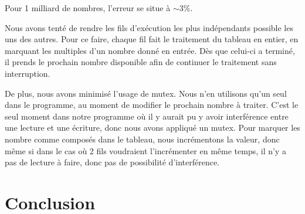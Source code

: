 \documentclass{report}
\begin{document}
	Pour 1 milliard de nombres, l'erreur se situe à $\sim 3\%$.
	
	\bigskip
	Nous avons tenté de rendre les fils d'exécution les plus indépendants 
	possible les uns des autres. Pour ce faire, chaque fil fait le traitement 
	du tableau en entier, en marquant les multiples d'un nombre donné en entrée. 
	Dès que celui-ci a terminé, il prends le prochain nombre disponible afin de 
	continuer le traitement sans interruption.
	
	\smallskip
	De plus, nous avons minimisé l'usage de mutex. Nous n'en utilisons qu'un seul 
	dans le programme, au moment de modifier le prochain nombre à traiter. C'est le 
	seul moment dans notre programme où il y aurait pu y avoir interférence entre 
	une lecture et une écriture, donc nous avons appliqué un mutex. Pour marquer les 
	nombre comme composés dans le tableau, nous incrémentons la valeur, donc même 
	si dans le cas où 2 fils voudraient l'incrémenter en même temps, il n'y a pas 
	de lecture à faire, donc pas de possibilité d'interférence.
	
\chapter{Conclusion}
\end{document}
